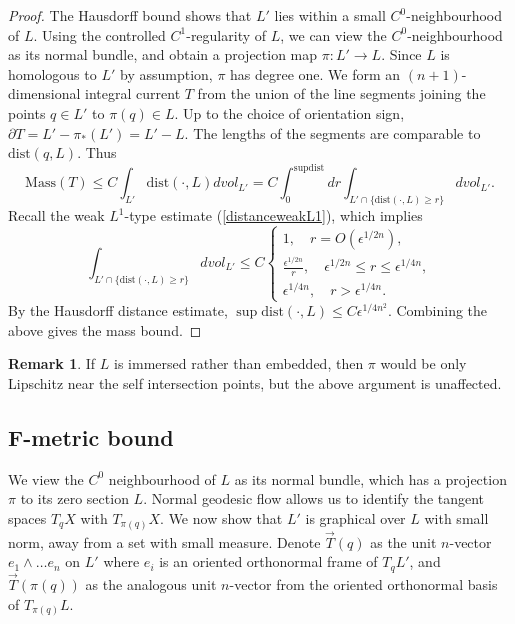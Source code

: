 \documentclass[a4paper]{article}
\theoremstyle{definition}
\newtheorem{rmk}{Remark}
\begin{document}
\begin{proof}
The Hausdorff bound shows that $L'$ lies within a small $C^0$-neighbourhood of $L$. Using the controlled $C^1$-regularity of $L$, we can view the $C^0$-neighbourhood as its normal bundle, and obtain a projection map $\pi: L'\to L$.  Since $L$ is homologous to $L'$ by assumption, $\pi$ has degree one. We form an $(n+1)$-dimensional integral current $T$ from the union of the line segments joining the points $q\in L'$ to $\pi(q)\in L$. Up to the choice of orientation sign, $\partial T= L'-\pi_*(L')= L'-L$. The lengths of the segments are comparable to $\text{dist}(q,L)$. Thus
\[
\text{Mass}(T)\leq C \int_{L'} \text{dist}(\cdot, L) dvol_{L'} = C \int_0^{\sup \text{dist}} dr \int_{ L'\cap  \{\text{dist}(\cdot, L)\geq r \} }  dvol_{L'}.
\]
Recall the weak $L^1$-type estimate (\ref{distanceweakL1}), which implies
\[
\int_{ L'\cap  \{\text{dist}(\cdot, L)\geq r \} }  dvol_{L'} \leq C\begin{cases}
1,\quad r=O(\epsilon^{1/2n} ),
\\
\frac{ \epsilon^{1/2n}} {r}, \quad \epsilon^{1/2n}\leq r\leq \epsilon^{1/4n},
\\
\epsilon^{1/4n}, \quad  r>\epsilon^{1/4n}. 
\end{cases}
\]
By the Hausdorff distance estimate, $\sup \text{dist}(\cdot, L)\leq C\epsilon^{1/4n^2}$. 
 Combining the above gives the mass bound.
\end{proof}



\begin{rmk}
If $L$ is immersed rather than embedded, then $\pi$ would be only Lipschitz near the self intersection points, but the above argument is unaffected.
\end{rmk}



\subsection{F-metric bound}





We view the $C^0$ neighbourhood of $L$ as its normal bundle, which has a projection $\pi$ to its zero section $L$. Normal geodesic flow allows us to identify the tangent spaces $T_qX$ with $T_{\pi(q)}X$. We now show that $L'$ is graphical over $L$ with small norm, away from a set with small measure. Denote $\vec{T}(q)$ as the unit $n$-vector $e_1\wedge \ldots e_n$ on $L'$ where $e_i$ is an oriented orthonormal frame of $T_qL'$, and $\vec{T}(\pi(q))$ as the analogous unit $n$-vector from the oriented orthonormal basis of $T_{\pi(q)}L$.
\end{document}
